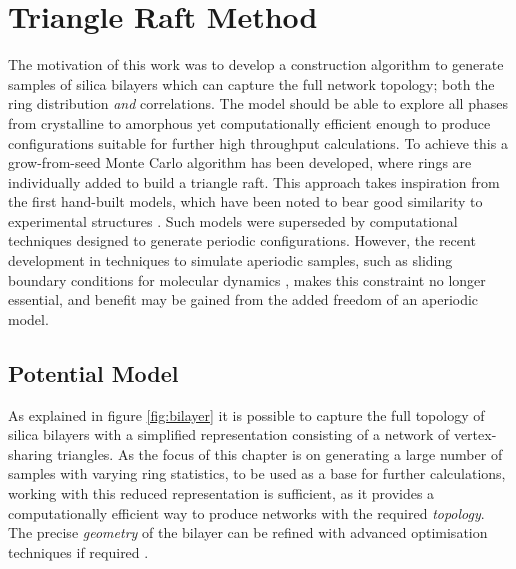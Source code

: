 \section{Triangle Raft Method}

The motivation of this work was to develop a construction algorithm to generate samples of silica bilayers which can capture the full \td{} network topology; both the ring distribution \textit{and} correlations. 
The model should be able to explore all phases from crystalline to amorphous yet computationally efficient enough to produce configurations suitable for further high throughput calculations. 
To achieve this a grow-from-seed Monte Carlo algorithm has been developed, where rings are individually added to build a triangle raft.
This approach takes inspiration from the first hand\--built models, which have been noted to bear good similarity to experimental structures \cite{Shackelford1982a,Buchner2016a}.
Such models were superseded by computational techniques designed to generate periodic configurations. 
However, the recent development in techniques to simulate aperiodic samples, such as sliding boundary conditions for molecular dynamics \cite{Theran2015}, makes this constraint no longer essential, and benefit may be gained from the added freedom of an aperiodic model.


\subsection{Potential Model}

As explained in figure \ref{fig:bilayer} it is possible to capture the full topology of silica bilayers with a simplified representation consisting of a network of vertex\--sharing \sioiii{} triangles. 
As the focus of this chapter is on generating a large number of samples with varying ring statistics, to be used as a base for further calculations,  working with this reduced representation is sufficient, as it provides a computationally efficient way to produce networks with the required \textit{topology}. 
The precise \textit{geometry} of the bilayer can be refined with advanced optimisation techniques if required \cite{Tangney2002}. 

